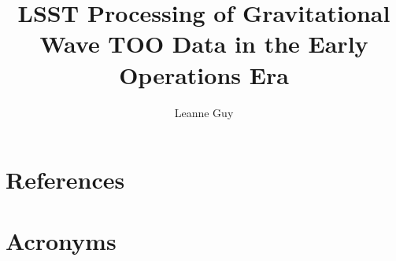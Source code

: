 \documentclass[DM,authoryear,toc]{lsstdoc}
\title{LSST Processing of Gravitational Wave TOO Data in the Early Operations Era}
\author{%
Leanne Guy
}
\date{\vcsDate}
\begin{document}
\maketitle


\appendix
\section{References} \label{sec:bib}
\renewcommand{\refname}{} %


\section{Acronyms} \label{sec:acronyms}

\end{document}
